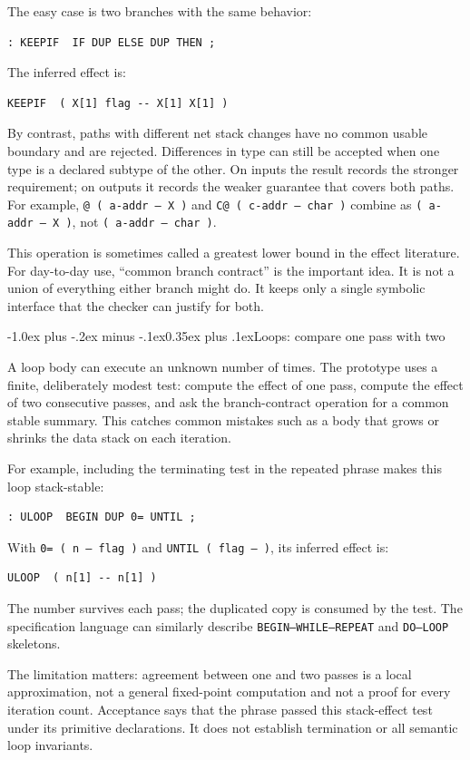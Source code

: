 \documentclass[a4paper,10pt]{article}
\makeatletter
\renewcommand\subsection{\@startsection{subsection}{2}{\z@}%
  {-1.0ex plus -.2ex minus -.1ex}{0.35ex plus .1ex}{\normalsize\bfseries}}
\makeatother
\begin{document}
The easy case is two branches with the same behavior:
\begin{lstlisting}
: KEEPIF  IF DUP ELSE DUP THEN ;
\end{lstlisting}
The inferred effect is:
\begin{lstlisting}
KEEPIF  ( X[1] flag -- X[1] X[1] )
\end{lstlisting}
By contrast, paths with different net stack changes have no common usable
boundary and are rejected.  Differences in type can still be accepted when one
type is a declared subtype of the other.  On inputs the result records the
stronger requirement; on outputs it records the weaker guarantee that covers
both paths.  For example, \texttt{@ ( a-addr -- X )} and
\texttt{C@ ( c-addr -- char )} combine as
\texttt{( a-addr -- X )}, not \texttt{( a-addr -- char )}.

This operation is sometimes called a greatest lower bound in the effect
literature.  For day-to-day use, ``common branch contract'' is the important
idea.  It is not a union of everything either branch might do.  It keeps only a
single symbolic interface that the checker can justify for both.

\subsection{Loops: compare one pass with two}

A loop body can execute an unknown number of times.  The prototype uses a
finite, deliberately modest test: compute the effect of one pass, compute the
effect of two consecutive passes, and ask the branch-contract operation for a
common stable summary.  This catches common mistakes such as a body that grows
or shrinks the data stack on each iteration.

For example, including the terminating test in the repeated phrase makes this
loop stack-stable:
\begin{lstlisting}
: ULOOP  BEGIN DUP 0= UNTIL ;
\end{lstlisting}
With \texttt{0= ( n -- flag )} and \texttt{UNTIL ( flag -- )}, its inferred
effect is:
\begin{lstlisting}
ULOOP  ( n[1] -- n[1] )
\end{lstlisting}
The number survives each pass; the duplicated copy is consumed by the test.
The specification language can similarly describe \texttt{BEGIN--WHILE--REPEAT}
and \texttt{DO--LOOP} skeletons.

The limitation matters: agreement between one and two passes is a local
approximation, not a general fixed-point computation and not a proof for every
iteration count.  Acceptance says that the phrase passed this stack-effect
test under its primitive declarations.  It does not establish termination or
all semantic loop invariants.
\end{document}
